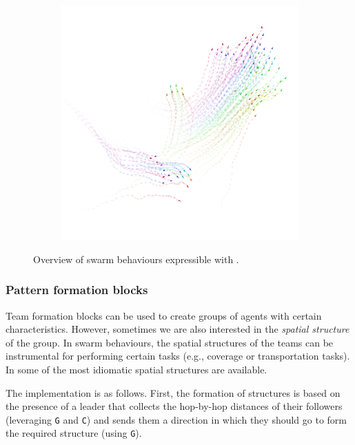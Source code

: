 \begin{figure}[t]
\begin{subfigure}{0.32\textwidth}
  \caption{}
  \label{fig:obstacle-avoidance}
\end{subfigure}
~
\begin{subfigure}{0.32\textwidth}
  \centering
  {\includegraphics[width=\textwidth]{papers/coordination2023-macro/images/flock.png}}
  \caption{}
  \label{fig:flock}
\end{subfigure}
\caption{Overview of swarm behaviours expressible with \MacroSwarm{}.}\label{fig:movement-overview}
\end{figure}

\subsubsection{Pattern formation blocks}\label{subsec:pattern}
Team formation blocks can be used to create groups of agents with certain characteristics.
%
However, sometimes we are also interested in the \emph{spatial structure} of the group. 
%
In swarm behaviours, the spatial structures of the teams can be instrumental for performing certain tasks (e.g., coverage or transportation tasks).
% 
In \MacroSwarm{} some of the most idiomatic spatial structures are available. 
%

The implementation is as follows. First, the formation of structures is based on the presence of a leader that
collects the hop-by-hop distances 
 of their followers (leveraging \lstinline|G| and \lstinline|C|) and
 sends them a direction in which they should go to form the required structure (using \lstinline|G|).

